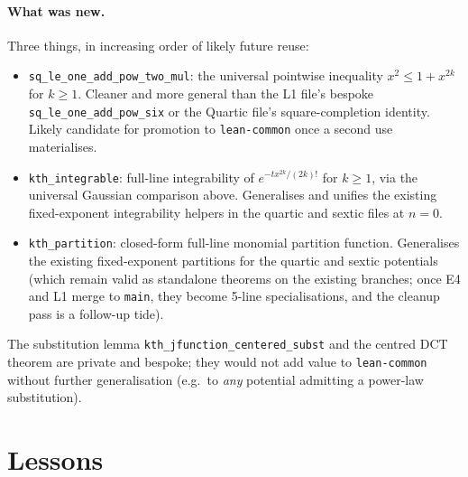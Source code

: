 \documentclass[11pt]{article}
\begin{document}
\paragraph{What was new.} Three things, in increasing order of
likely future reuse:

\begin{itemize}[leftmargin=1em,itemsep=0.2em]
\item \texttt{sq\_le\_one\_add\_pow\_two\_mul}: the universal pointwise
  inequality $x^2 \le 1 + x^{2k}$ for $k \ge 1$. Cleaner and more
  general than the L1 file's bespoke
  \texttt{sq\_le\_one\_add\_pow\_six} or the Quartic file's
  square-completion identity. Likely candidate for promotion to
  \texttt{lean-common} once a second use materialises.
\item \texttt{kth\_integrable}: full-line integrability of
  $e^{-t x^{2k}/(2k)!}$ for $k \ge 1$, via the universal Gaussian
  comparison above. Generalises and unifies the existing
  fixed-exponent integrability helpers in the quartic and sextic
  files at $n = 0$.
\item \texttt{kth\_partition}: closed-form full-line monomial
  partition function. Generalises the existing fixed-exponent
  partitions for the quartic and sextic potentials (which remain
  valid as standalone theorems on the existing branches; once E4 and
  L1 merge to \texttt{main}, they become 5-line specialisations,
  and the cleanup pass is a follow-up tide).
\end{itemize}

\noindent The substitution lemma \texttt{kth\_jfunction\_centered\_subst}
and the centred DCT theorem are private and bespoke; they would not
add value to \texttt{lean-common} without further generalisation
(e.g.\ to \emph{any} potential admitting a power-law substitution).

\section{Lessons}
\end{document}
